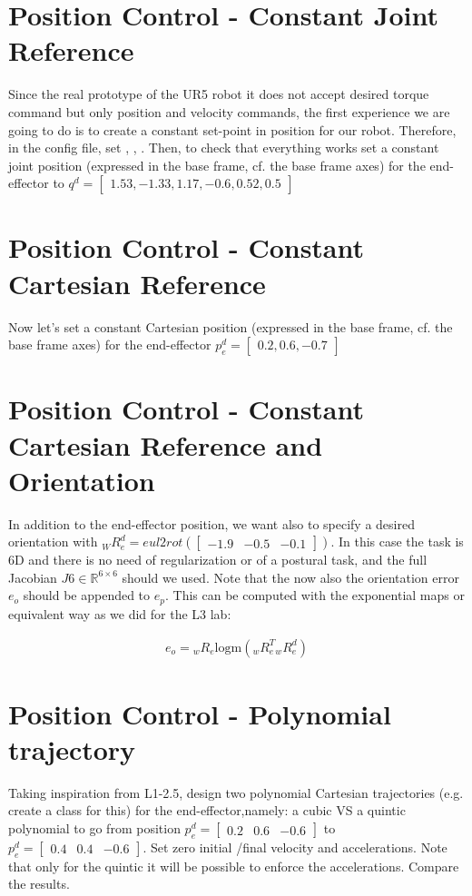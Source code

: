 \documentclass[11pt]{article}
\newcommand{\Rnum}{\mathbb{R}} %
\newcommand{\mat}[1]{\ensuremath{\begin{bmatrix}#1\end{bmatrix}}}	%
\begin{document}
\section{Position Control - Constant Joint Reference}
Since the real prototype of the UR5 robot it does not accept desired torque command but only position and velocity commands, 
the first experience we are going to do is to create a constant set-point in position for our robot. 
Therefore, in the  config file, set ,   , .
Then, to check that everything works set a constant joint position (expressed in the base frame, cf. the base frame axes) for the end-effector to $q^d=\mat{1.53, -1.33, 1.17, -0.6, 0.52, 0.5}$

\section{Position Control - Constant Cartesian Reference}
Now let's set a constant Cartesian position (expressed in the base frame, cf. the base frame axes) for the end-effector $p_e^d=\mat{0.2, 0.6, -0.7}   $

\section{Position Control - Constant Cartesian Reference and Orientation}
In addition to the end-effector position, we want also to specify a desired orientation with ${}_WR_e^d = eul2rot(\mat{-1.9& -0.5& -0.1})$.
In this case the task is 6D and there is no need of regularization or of a postural task, and the full Jacobian $J6 \in \Rnum^{6 \times 6}$ should we used. 
Note that the now also the orientation error $e_o$ should be appended to $e_p$. This can be computed with the exponential maps or equivalent way as we did for the L3 lab: 

\begin{align}
e_o = {}_wR_e \text{logm}({}_wR_e^T {}_wR_e^d)
\end{align}


\section{Position Control - Polynomial trajectory}
Taking inspiration from L1-2.5, design two polynomial Cartesian trajectories (e.g. create a class for this) for the end-effector,namely: a cubic VS a quintic polynomial to go from position $p_e^d=\mat{0.2& 0.6& -0.6}$  to $p_e^d=\mat{0.4& 0.4& -0.6}$. Set zero initial /final velocity and accelerations. Note that only for the quintic it will be possible to enforce the accelerations. Compare the results.
\end{document}
